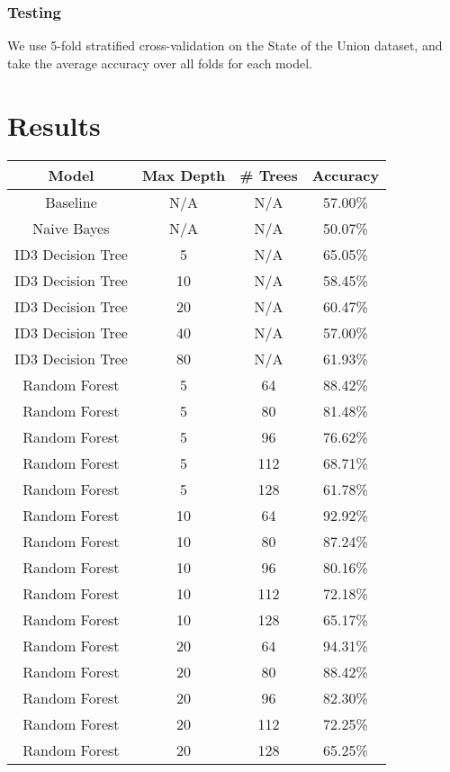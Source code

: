 \documentclass{amsart}
\theoremstyle{definition}
\theoremstyle{remark}
\numberwithin{equation}{section}
\begin{document}
\subsubsection{Testing}
We use 5-fold stratified cross-validation on the State of the Union dataset, and take the average accuracy over all folds for each model.\\

\section{Results}
\begin{center}
\begin{tabular}{||c c c c||}
\hline
Model & Max Depth & \# Trees & Accuracy
\\ [0.5ex]
\hline\hline
Baseline & N/A & N/A & 57.00\%\\
\hline
Naive Bayes & N/A & N/A & 50.07\%\\
\hline
ID3 Decision Tree & 5 & N/A & 65.05\%\\
\hline
ID3 Decision Tree & 10 & N/A & 58.45\%\\
\hline
ID3 Decision Tree & 20 & N/A & 60.47\%\\
\hline
ID3 Decision Tree & 40 & N/A & 57.00\%\\
\hline
ID3 Decision Tree & 80 & N/A & 61.93\%\\
\hline
Random Forest & 5 & 64 & 88.42\%\\
\hline
Random Forest & 5 & 80 & 81.48\%\\
\hline
Random Forest & 5 & 96 & 76.62\%\\
\hline
Random Forest & 5 & 112 & 68.71\%\\
\hline
Random Forest & 5 & 128 & 61.78\%\\
\hline
Random Forest & 10 & 64 & 92.92\%\\
\hline
Random Forest & 10 & 80 & 87.24\%\\
\hline
Random Forest & 10 & 96 & 80.16\%\\
\hline
Random Forest & 10 & 112 & 72.18\%\\
\hline
Random Forest & 10 & 128 & 65.17\%\\
\hline
Random Forest & 20 & 64 & 94.31\%\\
\hline
Random Forest & 20 & 80 & 88.42\%\\
\hline
Random Forest & 20 & 96 & 82.30\%\\
\hline
Random Forest & 20 & 112 & 72.25\%\\
\hline
Random Forest & 20 & 128 & 65.25\%\\

\end{tabular}
\end{center}
\end{document}
